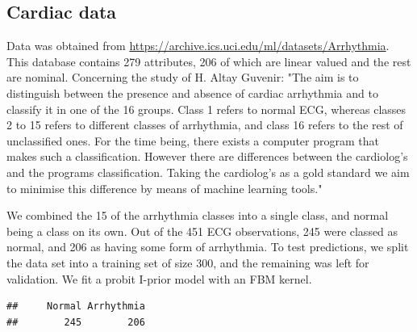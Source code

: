 \documentclass[class=article, crop=false]{standalone}\usepackage[]{graphicx}\usepackage[]{color}
\makeatletter
\newenvironment{kframe}{%
 \def\at@end@of@kframe{}%
 \ifinner\ifhmode%
  \def\at@end@of@kframe{\end{minipage}}%
  \begin{minipage}{\columnwidth}%
 \fi\fi%
 \def\FrameCommand##1{\hskip\@totalleftmargin \hskip-\fboxsep
 \colorbox{shadecolor}{##1}\hskip-\fboxsep
     \hskip-\linewidth \hskip-\@totalleftmargin \hskip\columnwidth}%
 \MakeFramed {\advance\hsize-\width
   \@totalleftmargin\z@ \linewidth\hsize
   \@setminipage}}%
 {\par\unskip\endMakeFramed%
 \at@end@of@kframe}
\newenvironment{knitrout}{}{} %
\makeatother
\begin{document}
\subsection{Cardiac data}

Data was obtained from \url{https://archive.ics.uci.edu/ml/datasets/Arrhythmia}. This database contains 279 attributes, 206 of which are linear valued and the rest are nominal. Concerning the study of H. Altay Guvenir: "The aim is to distinguish between the presence and absence of cardiac arrhythmia and to classify it in one of the 16 groups. Class 1 refers to normal ECG, whereas classes 2 to 15 refers to different classes of arrhythmia, and class 16 refers to the rest of unclassified ones. For the time being, there exists a computer program that makes such a classification. However there are differences between the cardiolog's and the programs classification. Taking the cardiolog's as a gold standard we aim to minimise this difference by means of machine learning  tools."

We combined the 15 of the arrhythmia classes into a single class, and normal being a class on its own. Out of the 451 ECG observations, 245 were classed as normal, and 206 as having some form of arrhythmia. To test predictions, we split the data set into a training set of size 300, and the remaining was left for validation. We fit a probit I-prior model with an FBM kernel.

\begin{knitrout}
\color{fgcolor}\begin{kframe}
\begin{verbatim}
##     Normal Arrhythmia 
##        245        206
\end{verbatim}
\end{kframe}
\end{knitrout}
\end{document}
